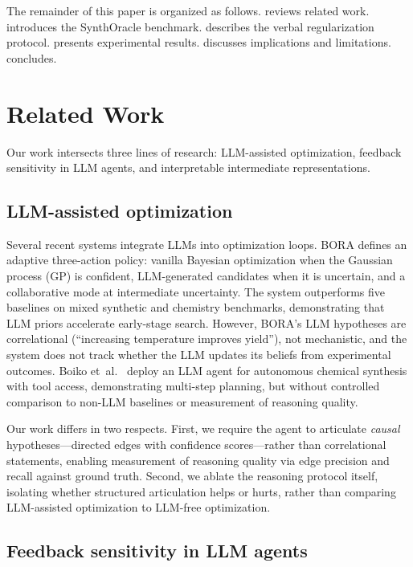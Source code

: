 \documentclass[11pt,letterpaper]{article}
\begin{document}
The remainder of this paper is organized as follows.
 reviews related work.
 introduces the SynthOracle benchmark.
 describes the verbal regularization protocol.
 presents experimental results.
 discusses implications and limitations.
 concludes.


\section{Related Work}
\label{sec:related}

Our work intersects three lines of research: LLM-assisted optimization,
feedback sensitivity in LLM agents, and interpretable intermediate
representations.

\subsection{LLM-assisted optimization}

Several recent systems integrate LLMs into optimization loops. BORA
\cite{cisse2025bora} defines an adaptive three-action policy: vanilla
Bayesian optimization when the Gaussian process (GP) is confident,
LLM-generated candidates when it is uncertain, and a collaborative mode
at intermediate uncertainty. The system outperforms five baselines on
mixed synthetic and chemistry benchmarks, demonstrating that LLM priors
accelerate early-stage search. However, BORA's LLM hypotheses are
correlational (``increasing temperature improves yield''), not
mechanistic, and the system does not track whether the LLM updates its
beliefs from experimental outcomes. Boiko et~al.\
\cite{boiko2023autonomous} deploy an LLM agent for autonomous chemical
synthesis with tool access, demonstrating multi-step planning, but
without controlled comparison to non-LLM baselines or measurement of
reasoning quality.

Our work differs in two respects. First, we require the agent to
articulate \emph{causal} hypotheses---directed edges with confidence
scores---rather than correlational statements, enabling measurement of
reasoning quality via edge precision and recall against ground truth.
Second, we ablate the reasoning protocol itself, isolating whether
structured articulation helps or hurts, rather than comparing
LLM-assisted optimization to LLM-free optimization.

\subsection{Feedback sensitivity in LLM agents}
\end{document}
